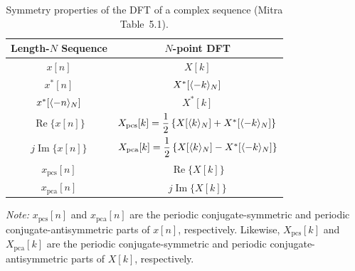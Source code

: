 
\begin{table}[H]
\centering
\caption{Symmetry properties of the DFT of a complex sequence (Mitra Table~5.1).}
\label{tab:dft-complex-symmetry}

\begin{tabular}{cc}
\toprule
\textbf{Length-$N$ Sequence} & \textbf{$N$-point DFT} \\
\midrule
$x[n]$ & $X[k]$ \\
\midrule
$x^{*}[n]$ & $X^{*}[\langle -k\rangle_{N}]$ \\[0.8em]
$x^{*}[\langle -n\rangle_{N}]$ & $X^{*}[k]$ \\[0.8em]
$\operatorname{Re}\{x[n]\}$ &
$X_{\mathrm{pcs}}[k]=\dfrac{1}{2}\left\{X[\langle k\rangle_{N}]+X^{*}[\langle -k\rangle_{N}]\right\}$ \\[0.8em]
$j\operatorname{Im}\{x[n]\}$ &
$X_{\mathrm{pca}}[k]=\dfrac{1}{2}\left\{X[\langle k\rangle_{N}]-X^{*}[\langle -k\rangle_{N}]\right\}$ \\[0.8em]
$x_{\mathrm{pcs}}[n]$ & $\operatorname{Re}\{X[k]\}$ \\[0.8em]
$x_{\mathrm{pca}}[n]$ & $j\operatorname{Im}\{X[k]\}$ \\
\bottomrule
\end{tabular}

\medskip

\parbox{0.9\textwidth}{
\textit{Note:}
$x_{\mathrm{pcs}}[n]$ and $x_{\mathrm{pca}}[n]$ are the periodic
conjugate-symmetric and periodic conjugate-antisymmetric parts of $x[n]$,
respectively. Likewise, $X_{\mathrm{pcs}}[k]$ and $X_{\mathrm{pca}}[k]$ are
the periodic conjugate-symmetric and periodic conjugate-antisymmetric parts
of $X[k]$, respectively.
}
\end{table}

